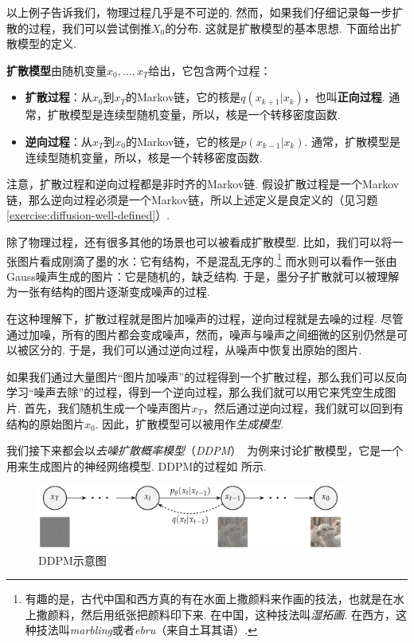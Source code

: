 以上例子告诉我们，物理过程几乎是不可逆的. 然而，如果我们仔细记录每一步扩散的过程，我们可以尝试倒推$X_0$的分布. 这就是扩散模型的基本思想. 下面给出扩散模型的定义.

\begin{definition}[扩散模型]
\textbf{扩散模型}由随机变量$x_0,\dots,x_T$给出，它包含两个过程：
\begin{itemize}
    \item \textbf{扩散过程}：从$x_0$到$x_T$的Markov链，它的核是$q(x_{k+1}|x_k)$，也叫\textbf{正向过程}. 通常，扩散模型是连续型随机变量，所以，核是一个转移密度函数. 
    
    \item \textbf{逆向过程}：从$x_T$到$x_0$的Markov链，它的核是$p(x_{k-1}|x_k)$. 通常，扩散模型是连续型随机变量，所以，核是一个转移密度函数. 
\end{itemize}
\end{definition}

注意，扩散过程和逆向过程都是非时齐的Markov链. 假设扩散过程是一个Markov链，那么逆向过程必须是一个Markov链，所以上述定义是良定义的（见习题 \ref{exercise:diffusion-well-defined}）. 

除了物理过程，还有很多其他的场景也可以被看成扩散模型. 比如，我们可以将一张图片看成刚滴了墨的水：它有结构，不是混乱无序的.\footnote{有趣的是，古代中国和西方真的有在水面上撒颜料来作画的技法，也就是在水上撒颜料，然后用纸张把颜料印下来. 在中国，这种技法叫\textit{湿拓画}. 在西方，这种技法叫\textit{marbling}或者\textit{ebru}（来自土耳其语）. } 而水则可以看作一张由Gauss噪声生成的图片：它是随机的，缺乏结构. 于是，墨分子扩散就可以被理解为一张有结构的图片逐渐变成噪声的过程. 

在这种理解下，扩散过程就是图片加噪声的过程，逆向过程就是去噪的过程. 尽管通过加噪，所有的图片都会变成噪声，然而，噪声与噪声之间细微的区别仍然是可以被区分的. 于是，我们可以通过逆向过程，从噪声中恢复出原始的图片. 

如果我们通过大量图片“图片加噪声”的过程得到一个扩散过程，那么我们可以反向学习“噪声去除”的过程，得到一个逆向过程，那么我们就可以用它来凭空生成图片. 首先，我们随机生成一个噪声图片$x_T$，然后通过逆向过程，我们就可以回到有结构的原始图片$x_0$. 因此，扩散模型可以被用作\textit{生成模型}. 

我们接下来都会以\textit{去噪扩散概率模型}（\textit{DDPM}）~\cite{hoDenoisingDiffusionProbabilistic2020}为例来讨论扩散模型，它是一个用来生成图片的神经网络模型. DDPM的过程如 所示. 

\begin{figure}[ht]
    \centering
    \includegraphics[width=0.9\textwidth]{figures/Markov-chain/DDPM.pdf}
    \caption{DDPM示意图}\label{fig:DDPM}
\end{figure}

